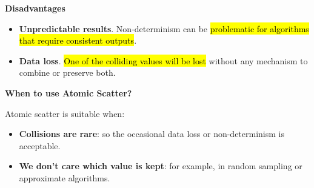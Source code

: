 \highspace
\begin{flushleft}
    \textcolor{Red2}{ \textbf{Disadvantages}}
\end{flushleft}
\begin{itemize}[label=\textcolor{Red2}{}]
    \item \textcolor{Red2}{\textbf{Unpredictable results}}. Non-determinism can be \hl{problematic for algorithms that require consistent outputs}.
    \item \textcolor{Red2}{\textbf{Data loss}}. \hl{One of the colliding values will be lost} without any mechanism to combine or preserve both.
\end{itemize}

\highspace
\begin{flushleft}
    \textcolor{Green3}{ \textbf{When to use Atomic Scatter?}}
\end{flushleft}
Atomic scatter is suitable when:
\begin{itemize}
    \item \textbf{Collisions are rare}: so the occasional data loss or non-determinism is acceptable.
    \item \textbf{We don't care which value is kept}: for example, in random sampling or approximate algorithms.
\end{itemize}
